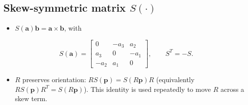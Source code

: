 \documentclass[11pt]{article}
\begin{document}
\subsection{\texorpdfstring{Skew-symmetric matrix $S(\cdot)$}{Skew-symmetric matrix S(cdot)}}
\begin{itemize}
\item $S(\mathbf a)\mathbf b = \mathbf a\times\mathbf b$, with
\end{itemize}
\[S(\mathbf a)=\begin{bmatrix}0&-a_3&a_2\\a_3&0&-a_1\\-a_2&a_1&0\end{bmatrix},\qquad S^T=-S.\]
\begin{itemize}
\item $R$ preserves orientation: $RS(\mathbf p)=S(R\mathbf p)R$ (equivalently $RS(\mathbf p)R^T=S(R\mathbf p)$). This identity is used repeatedly to move $R$ across a skew term.
\end{itemize}
\end{document}
